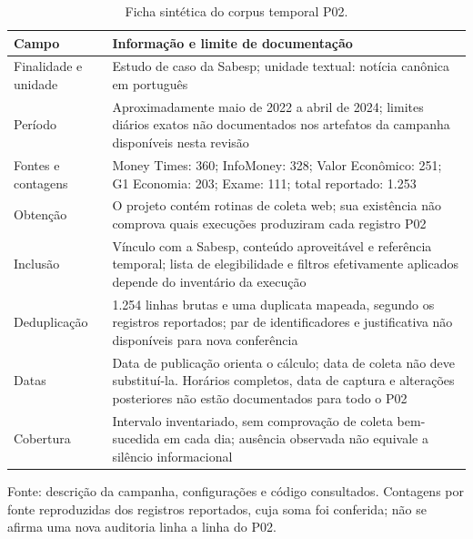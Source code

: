 \begin{table}[htbp]
\centering
\caption{Ficha sintética do corpus temporal P02.}
\label{tab:ficha-corpus}
\begin{tabularx}{\textwidth}{@{}P{0.25\textwidth}L@{}}
\toprule
Campo & Informação e limite de documentação \\
\midrule
Finalidade e unidade & Estudo de caso da Sabesp; unidade textual: notícia canônica em português \\
Período & Aproximadamente maio de 2022 a abril de 2024; limites diários exatos não documentados nos artefatos da campanha disponíveis nesta revisão \\
Fontes e contagens & Money Times: 360; InfoMoney: 328; Valor Econômico: 251; G1 Economia: 203; Exame: 111; total reportado: 1.253 \\
Obtenção & O projeto contém rotinas de coleta web; sua existência não comprova quais execuções produziram cada registro P02 \\
Inclusão & Vínculo com a Sabesp, conteúdo aproveitável e referência temporal; lista de elegibilidade e filtros efetivamente aplicados depende do inventário da execução \\
Deduplicação & 1.254 linhas brutas e uma duplicata mapeada, segundo os registros reportados; par de identificadores e justificativa não disponíveis para nova conferência \\
Datas & Data de publicação orienta o cálculo; data de coleta não deve substituí-la. Horários completos, data de captura e alterações posteriores não estão documentados para todo o P02 \\
Cobertura & Intervalo inventariado, sem comprovação de coleta bem-sucedida em cada dia; ausência observada não equivale a silêncio informacional \\
\bottomrule
\end{tabularx}
\par\smallskip
{\footnotesize Fonte: descrição da campanha, configurações e código consultados. Contagens por fonte reproduzidas dos registros reportados, cuja soma foi conferida; não se afirma uma nova auditoria linha a linha do P02.}
\end{table}

